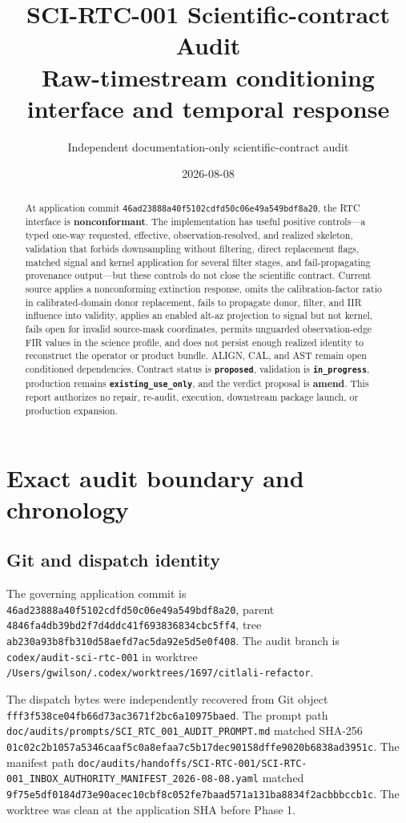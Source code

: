 \documentclass[11pt]{article}
\title{SCI-RTC-001 Scientific-contract Audit\\
Raw-timestream conditioning interface and temporal response}
\author{Independent documentation-only scientific-contract audit}
\date{2026-08-08}
\newcommand{\code}[1]{\nolinkurl{#1}}
\newcommand{\status}[1]{\textbf{\nolinkurl{#1}}}
\begin{document}
\maketitle

\begin{abstract}
At application commit
\code{46ad23888a40f5102cdfd50c06e49a549bdf8a20}, the RTC interface is
\textbf{nonconformant}.  The implementation has useful positive controls---a
typed one-way requested, effective, observation-resolved, and realized skeleton, validation that
forbids downsampling without filtering, direct replacement flags, matched
signal and kernel application for several filter stages, and fail-propagating
provenance output---but these controls do not close the scientific contract.
Current source applies a nonconforming extinction response, omits the
calibration-factor ratio in calibrated-domain donor replacement, fails to
propagate donor, filter, and IIR influence into validity, applies an enabled alt-az
projection to signal but not kernel, fails open for invalid source-mask
coordinates, permits unguarded observation-edge FIR values in the science
profile, and does not persist enough realized identity to reconstruct the
operator or product bundle.  ALIGN, CAL, and AST remain open conditioned
dependencies.  Contract status is \status{proposed}, validation is
\status{in_progress}, production remains \status{existing_use_only}, and the
verdict proposal is \textbf{amend}.  This report authorizes no repair,
re-audit, execution, downstream package launch, or production expansion.
\end{abstract}

\tableofcontents

\section{Exact audit boundary and chronology}

\subsection{Git and dispatch identity}

The governing application commit is
\code{46ad23888a40f5102cdfd50c06e49a549bdf8a20}, parent
\code{4846fa4db39bd2f7d4ddc41f693836834cbc5ff4}, tree
\code{ab230a93b8fb310d58aefd7ac5da92e5d5e0f408}.  The audit branch is
\code{codex/audit-sci-rtc-001} in worktree
\code{/Users/gwilson/.codex/worktrees/1697/citlali-refactor}.

The dispatch bytes were independently recovered from Git object
\code{fff3f538ce04fb66d73ac3671f2bc6a10975baed}.  The prompt path
\code{doc/audits/prompts/SCI_RTC_001_AUDIT_PROMPT.md} matched SHA-256
\code{01c02c2b1057a5346caaf5c0a8efaa7c5b17dec90158dffe9020b6838ad3951c}.
The manifest path
\code{doc/audits/handoffs/SCI-RTC-001/SCI-RTC-001_INBOX_AUTHORITY_MANIFEST_2026-08-08.yaml}
matched
\code{9f75e5df0184d73e90acec10cbf8c052fe7baad571a131ba8834f2acbbbccb1c}.
The worktree was clean at the application SHA before Phase 1.
\end{document}
